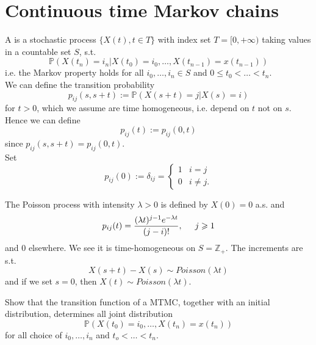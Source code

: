 \documentclass{article}
\begin{document}
	\section{Continuous time Markov chains}
	\begin{definition}
		A  is a stochastic process $\{X(t), t \in T\}$ with index set $T=[0,+ \infty)$ taking values in a countable set $S$, s.t. 
		\begin{equation*}
			\mathbb{P}(X(t_n)=i_n | X(t_0)=i_0, \dots, X(t_{n-1})= x(t_{n-1}))
		\end{equation*}
		i.e. the Markov property holds for all $i_0, \dots, i_n \in S$ and $0\leqslant t_0 < \dots < t_n$. \\
		We can define the transition probability 
		\begin{equation*}
			p_{ij}(s,s+t):= \mathbb{P}(X(s+t)=j|X(s)=i)
		\end{equation*}
		for $t>0$, which we assume are time homogeneous, i.e. depend on $t$ not on $s$. Hence we can define 
		\begin{equation*}
			p_{ij}(t):= p_{ij}(0,t)
		\end{equation*}
		since $p_{ij}(s,s+t)= p_{ij}(0,t)$.\\
		Set \[p_{ij}(0):=\delta_{ij}=\begin{cases}
			1 &i=j\\
			0 &i\neq j.
		\end{cases}\]
	\end{definition}
	\begin{example}
		The Poisson process with intensity $\lambda>0 $ is defined by $X(0)=0$ a.s. and 
		\begin{equation*}
			p_{ij}(t)= \frac{(\lambda t)^{j-1}e^{-\lambda t}}{(j-i)!}, \hspace{0.5 cm} j \geqslant 1
		\end{equation*}
		and $0$ elsewhere. We see it is time-homogeneous on $S = \mathbb{Z}_+$. The increments are s.t.
		\begin{equation*}
			X(s+t)-X(s) \sim Poisson (\lambda t)
		\end{equation*}
		and if we set $s=0$, then $X(t) \sim Poisson(\lambda t)$.
	\end{example}
	\begin{exercise}
		Show that the transition function of a MTMC, together with an initial distribution, determines all joint distribution 
		\begin{equation*}
			\mathbb{P}( X(t_0)=i_0, \dots, X(t_{n})= x(t_{n}))
		\end{equation*}
		for all choice of $i_0, \dots, i_n$ and $t_o <\dots < t_n$. \\
	\end{exercise}
\end{document}
